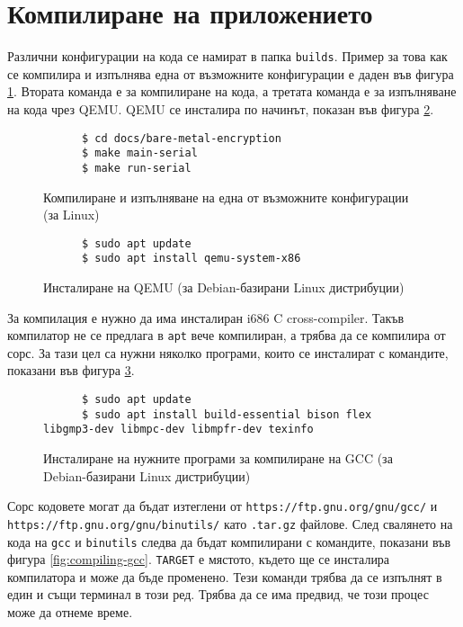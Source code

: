   \section{Компилиране на приложението}
  Различни конфигурации на кода се намират в папка {\tt builds}. Пример за това как се компилира и изпълнява една от възможните конфигурации е даден във фигура \ref{fig:build-making}. Втората команда е за компилиране на кода, а третата команда е за изпълняване на кода чрез QEMU. QEMU се инсталира по начинът, показан във фигура \ref{fig:installing-qemu}.

  \begin{figure}[htpb]
    \centering
    \begin{verbatim}
      $ cd docs/bare-metal-encryption
      $ make main-serial
      $ make run-serial
    \end{verbatim}
    \caption{Компилиране и изпълняване на една от възможните конфигурации (за Linux)}
    \label{fig:build-making}
  \end{figure}

  \begin{figure}[htpb]
    \centering
    \begin{verbatim}
      $ sudo apt update
      $ sudo apt install qemu-system-x86
    \end{verbatim}
    \caption{Инсталиране на QEMU (за Debian-базирани Linux дистрибуции)}
    \label{fig:installing-qemu}
  \end{figure}

  За компилация е нужно да има инсталиран i686 C cross-compiler. Такъв компилатор не се предлага в {\tt apt} вече компилиран, а трябва да се компилира от сорс. За тази цел са нужни няколко програми, които се инсталират с командите, показани във фигура \ref{fig:gcc-requirements}.

  \begin{figure}[htpb]
    \centering
    \begin{verbatim}
      $ sudo apt update
      $ sudo apt install build-essential bison flex libgmp3-dev libmpc-dev libmpfr-dev texinfo
    \end{verbatim}
    \caption{Инсталиране на нужните програми за компилиране на GCC (за Debian-базирани Linux дистрибуции)}
    \label{fig:gcc-requirements}
  \end{figure}

  Сорс кодовете могат да бъдат изтеглени от {\tt https://ftp.gnu.org/gnu/gcc/} и {\tt https://ftp.gnu.org/gnu/binutils/} като {\tt .tar.gz} файлове. След свалянето на кода на {\tt gcc} и {\tt binutils} следва да бъдат компилирани с командите, показани във фигура \ref{fig:compiling-gcc}.
  {\tt TARGET} е мястото, където ще се инсталира компилатора и може да бъде променено. Тези команди трябва да се изпълнят в един и същи терминал в този ред.
  Трябва да се има предвид, че този процес може да отнеме време.

